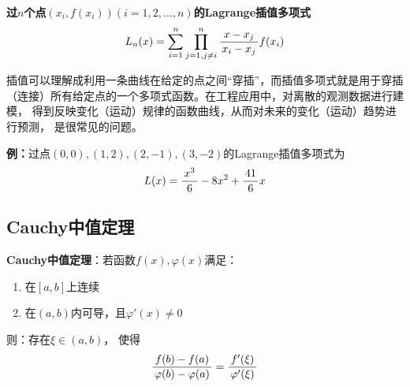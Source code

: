 \begin{shaded}
	\begin{tcolorbox}
		{\bf 过$n$个点$(x_i,f(x_i))(i=1,2,\ldots,n)$的Lagrange插值多项式}
		$$L_n(x)=\sum\limits_{i=1}^n\prod_{j=1,j\ne i}^{n}
		\displaystyle\frac{\,{x-x_j}\,}{\,{x_i-x_j}\,}f(x_i)$$
	\end{tcolorbox}
	
	插值可以理解成利用一条曲线在给定的点之间“穿插”，而插值多项式就是用于穿插
	（连接）所有给定点的一个多项式函数。在工程应用中，对离散的观测数据进行建模，
	得到反映变化（运动）规律的函数曲线，从而对未来的变化（运动）趋势进行预测，
	是很常见的问题。
	
	{\bf 例：}过点$(0,0),(1,2),(2,-1),(3,-2)$的Lagrange插值多项式为
	$$L(x)=\displaystyle\frac{\,{x^3}\,}{\,{6}\,}-8x^2+\displaystyle\frac{\,{41}\,}{\,{6}\,}x$$
	
	\begin{center}
	\end{center}
\end{shaded}

\subsection{Cauchy中值定理}

\begin{thx}
	{\bf Cauchy中值定理}：若函数$f(x),\varphi(x)$满足： 
	\begin{enumerate}[(1)]
	  \setlength{\itemindent}{1cm}
	  \item 在$[a,b]$上连续 
	  \item 在$(a,b)$内可导，且$\varphi'(x)\ne 0$ 
	\end{enumerate}
	则：存在$\xi\in(a,b)$， 使得
	$$\displaystyle\frac{\,{f(b)-f(a)}\,}{\,{\varphi(b)-\varphi(a)}\,}=\displaystyle\frac{\,{f'(\xi)}\,}{\,{\varphi'(\xi)}\,}$$
\end{thx}

